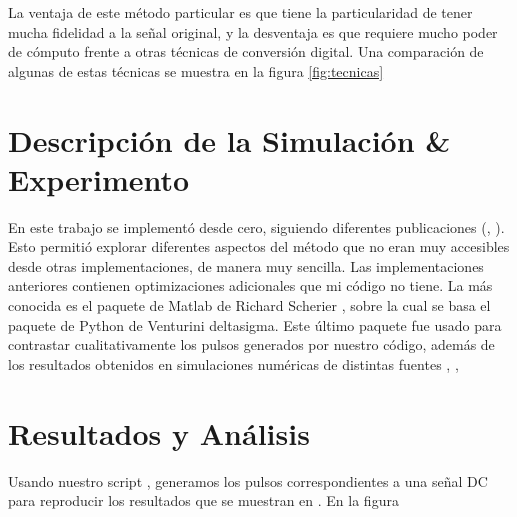 \documentclass[twoside]{article}
\begin{document}
\begin{multicols}{2}
La ventaja de este método particular es que tiene la particularidad de tener mucha fidelidad a la señal original, y la desventaja es que requiere mucho poder de cómputo frente a otras técnicas de conversión digital. Una comparación de algunas de estas técnicas se muestra en la figura \ref{fig:tecnicas}


\section{Descripción de la Simulación \& Experimento}

En este trabajo se implementó desde cero, siguiendo diferentes publicaciones (\cite{delarosa2011}, \cite{aziz1996}). Esto permitió explorar diferentes aspectos del método que no eran muy accesibles desde otras implementaciones, de manera muy sencilla.
Las implementaciones anteriores contienen optimizaciones adicionales que mi código no tiene. La más conocida es el paquete de Matlab de Richard Scherier \cite{DSmatlab}, sobre la cual se basa el paquete de Python de Venturini deltasigma. Este último paquete fue usado para contrastar cualitativamente los pulsos generados por nuestro código, además de los resultados obtenidos en simulaciones numéricas de distintas fuentes \cite{aziz1996}, \cite{delarosa2011},


\section{Resultados y Análisis}

Usando nuestro script \cite{script}, generamos los pulsos correspondientes a una señal DC para reproducir los resultados que se muestran en \cite{aziz1996}. En la figura 







\newpage 




\nocite{*} %

\end{multicols}
\end{document}
